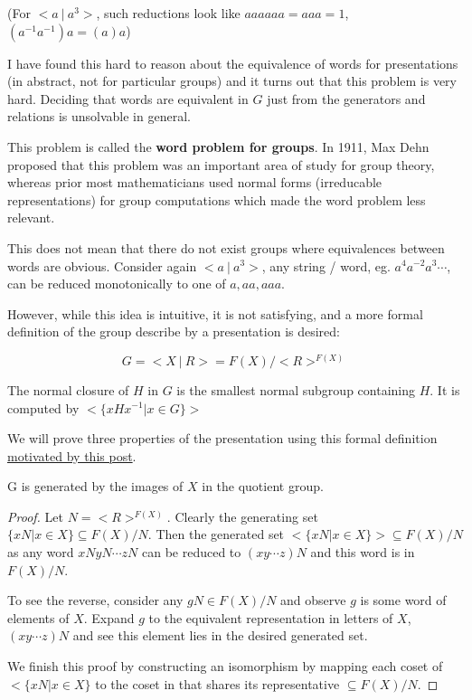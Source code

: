 \documentclass[10pt]{article}
\begin{document}
(For $<a ~|~a^3>$, such reductions look like $aaaaaa = aaa = 1$, $(a^{-1}a^{-1})a = (a)a$)

I have found this hard to reason about the equivalence of words for
presentations (in abstract, not for particular groups) and it turns out that
this problem is very hard. Deciding that words are equivalent in $G$ just from
the generators and relations is unsolvable in general.

\begin{note}
	This problem is called the \textbf{word problem for groups}. In 1911, Max
	Dehn proposed that this problem was an important area of study for group
	theory, whereas prior most mathematicians used normal forms (irreducable
	representations) for group computations which made the word problem less
	relevant.
\end{note}

This does not mean that there do not exist groups where equivalences between
words are obvious. Consider again $<a ~|~a^3>$, any string / word, eg.
$a^4a^{-2}a^3\cdots$, can be reduced monotonically to one of $a, aa, aaa$. 

However, while this idea is intuitive, it is not satisfying, and a more formal
definition of the group describe by a presentation is desired:

\[ G = <X~|~R> = F(X) / <R>^{F(X)} \]

\begin{definition}
	The normal closure of $H$ in $G$ is the smallest normal subgroup containing
	$H$. It is computed by $< \{ xHx^{-1} | x \in G \} >$
\end{definition}

We will prove three properties of the presentation using this formal definition
\href{https://math.stackexchange.com/a/695061/1276086}{motivated by this post}.

\begin{proposition}
	G is generated by the images of $X$ in the quotient group.
\end{proposition}
\begin{proof}
Let $N = <R>^{F(X)}$. Clearly the generating set $\{ xN | x \in X \} \subseteq F(X) / N$. Then the
generated set $< \{ xN | x \in X \} > \subseteq F(X) / N$ as any word
$xNyN \cdots zN$ can be reduced to $(xy \cdots z)N$ and this word is in
$F(X) / N$.

To see the reverse, consider any $gN \in F(X) / N$ and observe $g$ is some word of
elements of $X$. Expand $g$ to the equivalent representation in letters of
$X$, $(xy \cdots z)N$ and see this element lies in the desired generated set.

We finish this proof by constructing an isomorphism by mapping each coset of $<
\{ xN | x \in X \}$ to the coset in that shares its representative $\subseteq
F(X) / N$.
\end{proof}
\end{document}
